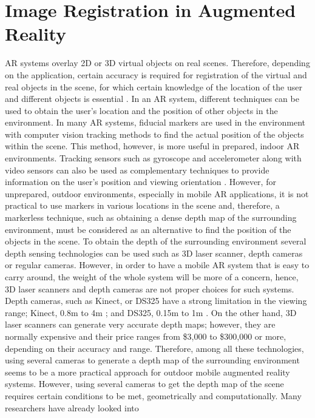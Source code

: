 \section{Image Registration in Augmented Reality}
AR systems overlay 2D or 3D virtual objects on real scenes. Therefore, depending on the application, certain accuracy is required for 
registration of the virtual and real objects in the scene, for which certain knowledge of the location of the user and different objects 
is essential \cite{azuma01}.
In an AR system, different techniques can be used to 
obtain the user's location and the position of other objects in the environment. In many AR systems, fiducial markers are used
in the environment with computer vision tracking methods to find the actual position of the objects within the scene. This method, however, is 
more useful in prepared, indoor AR environments. Tracking sensors such as gyroscope and accelerometer along with video sensors can 
also be used as complementary techniques to provide information on the user's position and viewing orientation \cite{azuma01}. 
However, for unprepared, outdoor environments, especially in mobile AR applications, it is not practical to use markers in various locations 
in the scene and, therefore, a markerless technique, such as obtaining a dense depth map of the surrounding environment,
must be considered as an alternative to find the position of the objects in the scene.
To obtain the depth of the 
surrounding environment several depth sensing technologies can be used such as 3D laser scanner, depth cameras or regular cameras. However, in order to have a mobile AR
system that is easy to carry around, the weight of the whole system will be more of a concern, hence, 
3D laser scanners and depth cameras are not proper choices for such systems.
Depth cameras, such as Kinect, or DS325 have a strong limitation in the viewing range; Kinect, 0.8m to 4m \cite{mkinect}; and DS325, 0.15m to 1m \cite{skinetic}. 
On the other hand, 3D laser scanners can
generate very accurate depth maps; however, they are normally expensive and their price ranges from \$3,000 to \$300,000 or more, 
depending on their accuracy and range.
Therefore, among all these technologies, using several 
cameras to generate a depth map of the surrounding environment seems to be a more practical approach for outdoor mobile augmented reality systems. {\newline}
However, using several cameras to get the depth map of the scene requires certain conditions to be met, geometrically and computationally. Many researchers have already looked into
